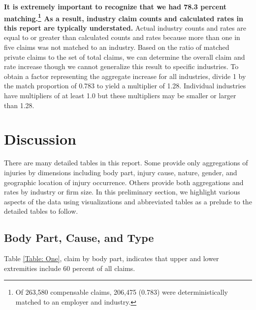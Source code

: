 \documentclass[9pt, oneside]{article}   	%
\begin{document}
\textbf{It is extremely important to recognize that we had 78.3 percent matching.\footnote{Of 263,580 compensable claims, 206,475 (0.783) were deterministically matched to an employer and industry.}  As a result, industry claim counts and calculated rates in this report are typically understated.} Actual industry counts and rates are equal to or greater than calculated counts and rates because more than one in five claims was not matched to an industry. Based on the ratio of matched private claims to the set of total claims, we can determine the overall claim and rate increase though we cannot generalize this result to specific industries. To obtain a factor representing the aggregate increase for all industries, divide 1 by the match proportion of 0.783 to yield a multiplier of 1.28.  Individual industries have multipliers of at least 1.0 but these multipliers may be smaller or larger than 1.28.
















\section{Discussion}

There are many detailed tables in this report. Some provide only aggregations of injuries by dimensions including body part, injury cause, nature, gender, and geographic location of injury occurrence. Others provide both aggregations and rates by industry or firm size. In this preliminary section, we highlight various aspects of the data using visualizations and abbreviated tables as a prelude to the detailed tables to follow. 

\subsection{Body Part, Cause, and Type}
Table \ref{Table: One}, claim by body part, indicates that upper and lower extremities include 60 percent of all claims. 
\end{document}

